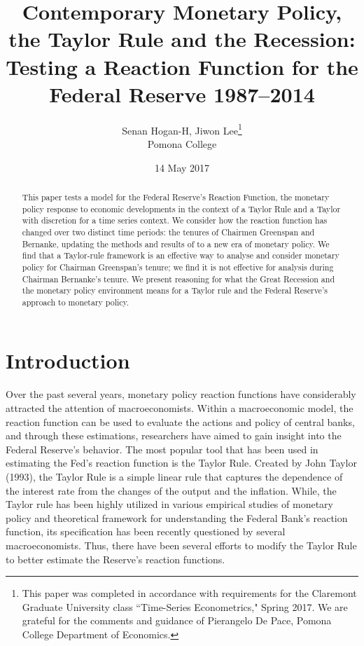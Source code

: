 \documentclass[notitlepage,12pt]{article}
\author{Senan Hogan-H, Jiwon Lee\footnote{This paper was completed in accordance with requirements for the Claremont Graduate University class ``Time-Series Econometrics," Spring 2017.  We are grateful for the comments and guidance of Pierangelo De Pace, Pomona College Department of Economics.} \\ Pomona College}
\title{Contemporary Monetary Policy, the Taylor Rule and the Recession: \\
\Large{Testing a Reaction Function for the Federal Reserve 1987--2014 }}
\date{14 May 2017}
\begin{document}
\clearpage\maketitle
\thispagestyle{empty}
\begin{abstract}
This paper tests a model for the Federal Reserve's Reaction Function, the monetary policy response to economic developments in the context of a Taylor Rule and a Taylor with discretion for a time series context.  We consider how the reaction function has changed over two distinct time periods: the tenures of Chairmen Greenspan and Bernanke, updating the methods and results of \cite{judd1998taylor} to a new era of monetary policy.  We find that a Taylor-rule framework is an effective way to analyse and consider monetary policy for Chairman Greenspan's tenure; we find it is not effective for analysis during Chairman Bernanke's tenure.  We present reasoning for what the Great Recession and the monetary policy environment means for a Taylor rule and the Federal Reserve's approach to monetary policy.
\end{abstract}

\newpage
\setcounter{page}{1}
\section{Introduction}
Over the past several years, monetary policy reaction functions have considerably attracted the attention of macroeconomists. Within a macroeconomic model, the reaction function can be used to evaluate the actions and policy of central banks, and through these estimations, researchers have aimed to gain insight into the Federal Reserve's behavior. The most popular tool that has been used in estimating the Fed's reaction function is the Taylor Rule. Created by John Taylor (1993), the Taylor Rule is a simple linear rule that captures the dependence of the interest rate from the changes of the output and the inflation. While, the Taylor rule has been highly utilized in various empirical studies of monetary policy and theoretical framework for understanding the Federal Bank's reaction function, its specification has been recently questioned by several macroeconomists. Thus, there have been several efforts to modify the Taylor Rule to better estimate the Reserve's reaction functions.
\end{document}
